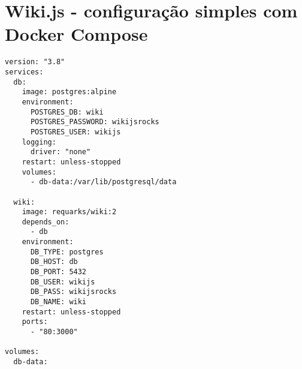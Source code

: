 \appendix
\section{Wiki.js - configuração simples com Docker Compose}\label{appendix:wiki-docker-compose}
\begin{lstlisting}[language=docker-compose-2]
version: "3.8"
services:
  db:
    image: postgres:alpine
    environment:
      POSTGRES_DB: wiki
      POSTGRES_PASSWORD: wikijsrocks
      POSTGRES_USER: wikijs
    logging:
      driver: "none"
    restart: unless-stopped
    volumes:
      - db-data:/var/lib/postgresql/data

  wiki:
    image: requarks/wiki:2
    depends_on:
      - db
    environment:
      DB_TYPE: postgres
      DB_HOST: db
      DB_PORT: 5432
      DB_USER: wikijs
      DB_PASS: wikijsrocks
      DB_NAME: wiki
    restart: unless-stopped
    ports:
      - "80:3000"

volumes:
  db-data:
\end{lstlisting}
\clearpage
